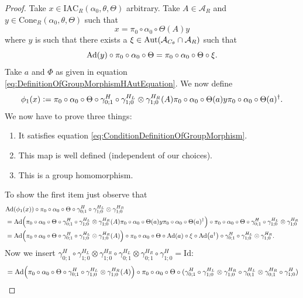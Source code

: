 \documentclass[12pt,a4paper,twoside]{article}
\newcommand{\defeq}{\vcentcolon=}
\let\originalleft\left
\let\originalright\right
\renewcommand{\left}{\mathopen{}\mathclose\bgroup\originalleft}
\renewcommand{\right}{\aftergroup\egroup\originalright}
\renewcommand{\AA}{\mathcal A}
\newcommand{\Ad}[1]{\textrm{Ad}\left(#1\right)}
\newcommand{\Aut}[1]{\textrm{Aut}\left(#1\right)}
\theoremstyle{definition}
\numberwithin{equation}{section}
\begin{document}
\begin{proof}
	Take $x\in \textrm{IAC}_R(\alpha_0,\theta,\Theta)$ arbitrary. Take $A\in\AA_R$ and $y\in\textrm{Cone}_R(\alpha_0,\theta,\Theta)$ such that
	\begin{equation}
	x=\pi_0\circ\alpha_0\circ\Theta(A)y
	\end{equation}
	where $y$ is such that there exists a $\xi\in\Aut{\AA_{C_\theta}\cap \AA_R}$ such that
	\begin{equation}
	\Ad{y}\circ\pi_0\circ\alpha_0\circ\Theta=\pi_0\circ\alpha_0\circ\Theta\circ\xi.
	\end{equation}
	Take $a$ and $\Phi$ as given in equation \eqref{eq:DefinitionOfGroupMorphismHAutEquation}. We now define
	\begin{equation}
		\phi_1(x)\defeq \pi_0\circ\alpha_0\circ\Theta\circ\gamma^H_{0;1}\circ\gamma^{H_L}_{1;0}\otimes\gamma^{H_R}_{1;0}(A)\pi_0\circ\alpha_0\circ\Theta(a)y\pi_0\circ\alpha_0\circ\Theta(a)^\dagger.
	\end{equation}
	We now have to prove three things:
	\begin{enumerate}
		\item It satisfies equation \eqref{eq:ConditionDefinitionOfGroupMorphism}.
		\item This map is well defined (independent of our choices).
		\item This is a group homomorphism.
	\end{enumerate}
	To show the first item just observe that
	\begin{align}
		&\Ad{\phi_1(x)}\circ\pi_0\circ\alpha_0\circ\Theta\circ\gamma^H_{0;1}\circ\gamma^{H_L}_{1;0}\otimes\gamma^{H_R}_{1;0}\\
		&=\Ad{\pi_0\circ\alpha_0\circ\Theta\circ\gamma^H_{0;1}\circ\gamma^{H_L}_{1;0}\otimes\gamma^{H_R}_{1;0}(A)\pi_0\circ\alpha_0\circ\Theta(a)y\pi_0\circ\alpha_0\circ\Theta(a)^\dagger}\circ\pi_0\circ\alpha_0\circ\Theta\circ\gamma^H_{0;1}\circ\gamma^{H_L}_{1;0}\otimes\gamma^{H_R}_{1;0}\\
		&=\Ad{\pi_0\circ\alpha_0\circ\Theta\circ\gamma^H_{0;1}\circ\gamma^{H_L}_{1;0}\otimes\gamma^{H_R}_{1;0}(A)}\circ\pi_0\circ\alpha_0\circ\Theta\circ\Ad{a}\circ\xi\circ\Ad{a^\dagger}\circ\gamma^H_{0;1}\circ\gamma^{H_L}_{1;0}\otimes\gamma^{H_R}_{1;0}.
	\end{align}
	Now we insert $\gamma^H_{0;1}\circ\gamma^{H_L}_{1;0}\otimes\gamma^{H_R}_{1;0}\circ\gamma^{H_L}_{0;1}\otimes\gamma^{H_R}_{0;1}\circ\gamma^H_{1;0}=\text{Id}:$
	\begin{align}
		&=\Ad{\pi_0\circ\alpha_0\circ\Theta\circ\gamma^H_{0;1}\circ\gamma^{H_L}_{1;0}\otimes\gamma^{H_R}_{1;0}(A)}\circ\pi_0\circ\alpha_0\circ\Theta\circ(\gamma^H_{0;1}\circ\gamma^{H_L}_{1;0}\otimes\gamma^{H_R}_{1;0}\circ\gamma^{H_L}_{0;1}\otimes\gamma^{H_R}_{0;1}\circ\gamma^H_{1;0})\\

\end{align}
\end{proof}
\end{document}
